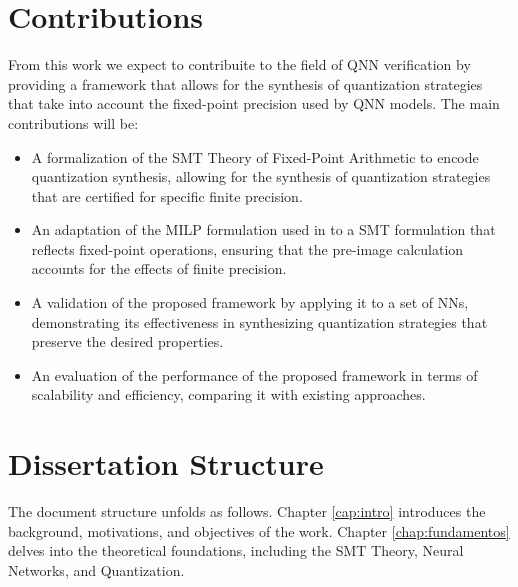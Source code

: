 \section{Contributions}
From this work we expect to contribuite to the field of QNN verification by providing a framework that allows for the synthesis of quantization strategies that take into account the fixed-point precision used by QNN models. The main contributions will be:
\begin{itemize}
    \item A formalization of the SMT Theory of Fixed-Point Arithmetic to encode quantization synthesis, allowing for the synthesis of quantization strategies that are certified for specific finite precision.
    \item An adaptation of the MILP formulation used in \cite{cai2025certified} to a SMT formulation that reflects fixed-point operations, ensuring that the pre-image calculation accounts for the effects of finite precision.
    \item A validation of the proposed framework by applying it to a set of NNs, demonstrating its effectiveness in synthesizing quantization strategies that preserve the desired properties.
    \item An evaluation of the performance of the proposed framework in terms of scalability and efficiency, comparing it with existing approaches.
\end{itemize}   

\section{Dissertation Structure}

The document structure unfolds as follows. Chapter \ref{cap:intro} introduces the background, motivations, and objectives of the work. Chapter \ref{chap:fundamentos} delves into the theoretical foundations, including the SMT Theory, Neural Networks, and Quantization.



